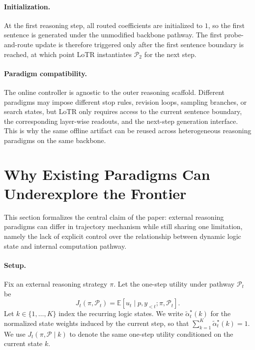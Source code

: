 \paragraph{Initialization.}
At the first reasoning step, all routed coefficients are initialized to \(1\), so the first sentence is generated under the unmodified backbone pathway. The first probe-and-route update is therefore triggered only after the first sentence boundary is reached, at which point LoTR instantiates \(\mathcal{P}_{2}\) for the next step.

\paragraph{Paradigm compatibility.}
The online controller is agnostic to the outer reasoning scaffold. Different paradigms may impose different stop rules, revision loops, sampling branches, or search states, but LoTR only requires access to the current sentence boundary, the corresponding layer-wise readouts, and the next-step generation interface. This is why the same offline artifact can be reused across heterogeneous reasoning paradigms on the same backbone.


\clearpage
{}

\section{Why Existing Paradigms Can Underexplore the Frontier}
\label{app:theory_frontier}

This section formalizes the central claim of the paper: external reasoning paradigms can differ in trajectory mechanism while still sharing one limitation, namely the lack of explicit control over the relationship between dynamic logic state and internal computation pathway.

\paragraph{Setup.}
Fix an external reasoning strategy \(\pi\). Let the one-step utility under pathway \(\mathcal{P}_t\) be
\begin{equation}
J_t(\pi,\mathcal{P}_t)
=
\mathbb{E}[u_t \mid p,y_{<t};\pi,\mathcal{P}_t].
\label{eq:app_frontier_utility}
\end{equation}
Let \(k\in\{1,\dots,K\}\) index the recurring logic states. We write \(\tilde{\alpha}_t^\star(k)\) for the normalized state weights induced by the current step, so that \(\sum_{k=1}^K \tilde{\alpha}_t^\star(k)=1\). We use \(J_t(\pi,\mathcal{P}\mid k)\) to denote the same one-step utility conditioned on the current state \(k\).

